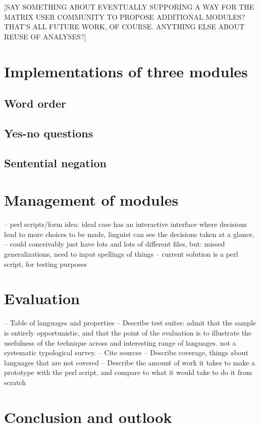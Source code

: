 \documentclass[11pt]{article}
\begin{document}
[SAY SOMETHING ABOUT EVENTUALLY SUPPORING A WAY FOR THE MATRIX USER
COMMUNITY TO PROPOSE ADDITIONAL MODULES?  THAT'S ALL FUTURE WORK, OF
COURSE.  ANYTHING ELSE ABOUT REUSE OF ANALYSES?]


\section{Implementations of three modules}

\subsection{Word order}

\subsection{Yes-no questions}

\subsection{Sentential negation}

\section{Management of modules}
\label{management}

-- perl scripts/form idea: ideal case has an interactive interface
where decisions lead to more choices to be made, linguist can see
the decisions taken at a glance, 
-- could conceivably just have lots and lots of different files, but:
missed generalizations, need to input spellings of things
-- current solution is a perl script, for testing purposes

\section{Evaluation}

-- Table of languages and properties
-- Describe test suites: admit that the sample is entirely opportunistic,
and that the point of the evaluation is to illustrate the usefulness of the
technique across and interesting range of languages.  not a systematic 
typological survey.
-- Cite sources
-- Describe coverage, things about languages that are not covered
-- Describe the amount of work it takes to make a prototype with the
perl script, and compare to what it would take to do it from scratch

\section{Conclusion and outlook}
\end{document}
